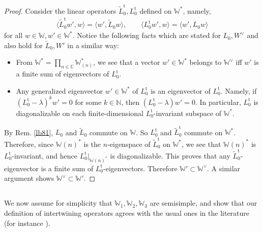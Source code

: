 \documentclass[12pt,a4paper,notitlepage]{article}
\theoremstyle{definition}
\theoremstyle{plain}
\newcommand{\wtd}{\widetilde}
\newcommand{\tr}{\mathrm{t}} %
\newcommand{\bk}[1]{\langle {#1}\rangle}
\newcommand{\Wbb}{\mathbb W}
\newcommand{\Cbb}{\mathbb C}
\newcommand{\Nbb}{\mathbb N}
\numberwithin{equation}{section}
\begin{document}
\begin{proof}
Consider the linear operators $\wtd L_0^\tr,L_0^\tr$ defined on $\Wbb^*$, namely,
\begin{align*}
\bk{\wtd L_0^\tr w',w}=\bk{w',\wtd L_0w},\qquad \bk{L_0^\tr w',w}=\bk{w',L_0w}
\end{align*}
for all $w\in \Wbb,w'\in \Wbb^*$. Notice the following facts which are stated for $L_0,W^\vee$ and also hold for $\wtd L_0,W'$ in a similar way:
\begin{itemize}
\item From $\Wbb^*=\prod_{n\in\Cbb}\Wbb_{(n)}^*$, we see that a vector $w'\in \Wbb^*$ belongs to $\Wbb^\vee$ iff $w'$ is a finite sum of eigenvectors of $L_0^\tr$.
\item Any generalized eigenvector $w'\in\Wbb^*$ of $L_0^\tr$ is an eigenvector of $L_0^\tr$. Namely, if $(L_0^\tr-\lambda)^kw'=0$ for some $k\in\Nbb$, then  $(L_0^\tr-\lambda)w'=0$. In particular, $L_0^\tr$ is diagonalizable  on each finite-dimensional $L_0^\tr$-invariant subspace of $\Wbb^*$. 
\end{itemize}
By Rem. \ref{lb81}, $L_0$ and $\wtd L_0$ commute on $\Wbb$. So $L_0^\tr$ and $\wtd L_0^\tr$ commute on $\Wbb^*$. Therefore, since $\Wbb(n)^*$ is the $n$-eigenspace of $\wtd L_0^\tr$ on $\Wbb^*$, we see that $\Wbb(n)^*$ is $L_0^\tr$-invariant, and hence $L_0^\tr|_{\Wbb(n)^*}$ is diagonalizable. This proves that any $\wtd L_0^\tr$-eigenvector is a finite sum of $L_0^\tr$-eigenvectors. Therefore $\Wbb'\subset\Wbb^\vee$. A similar argument shows $\Wbb^\vee\subset\Wbb'$.
\end{proof}





\subsection{}


We now assume for simplicity that $\Wbb_1,\Wbb_2,\Wbb_3$ are semisimple, and show that our definition of intertwining operators agrees with the usual ones in the literature (for instance \cite{FHL93}). 
\end{document}
